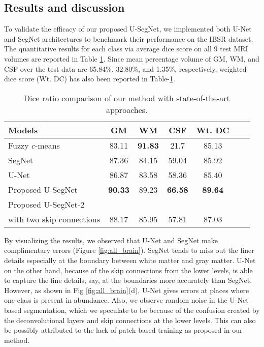 \documentclass{article}
\begin{document}
\subsection{Results and discussion}

To validate the efficacy of our proposed U-SegNet, we implemented both U-Net and SegNet architectures to benchmark their performance on the IBSR dataset. The quantitative results for each class via average dice score on all 9 test MRI volumes are reported in Table \ref{table:datasets}. Since mean percentage volume of GM, WM, and CSF over the test data are 65.84\%, 32.80\%, and 1.35\%, respectively, weighted dice score (Wt. DC) has also been reported in Table-\ref{table:datasets}.

\renewcommand{\tabcolsep}{0.08cm}
\begin{table}[!ht]
\centering
\begin{tabular}{l c c c c c c}
\toprule[0.2mm]
\textbf{Models}  & \textbf{GM}   & \textbf{WM}   &   \textbf{CSF} & \textbf{Wt. DC} \\
\midrule
Fuzzy $c$-means \cite{1} & 83.11 & \textbf{91.83} & 21.7 & 85.13 \\
\midrule

SegNet \cite{badrinarayanan2017segnet} & 87.36 & 84.15 & 59.04 & 85.92\\
\midrule

U-Net \cite{u-net} & 86.87& 83.58 & 58.36 & 85.40 \\
\midrule

Proposed U-SegNet & \textbf{90.33} & 89.23 & \textbf{66.58} & \textbf{89.64}\\
\midrule

Proposed U-SegNet-2 \\ with two skip connections & 88.17 & 85.95 & 57.81 & 87.03  \\
\bottomrule[0.2mm]
\end{tabular}
\caption{Dice ratio comparison of our method with state-of-the-art approaches. }
\label{table:datasets}
\end{table}

By visualizing the results, we observed that U-Net and SegNet make complimentary errors (Figure \ref{fig:all_brain}). SegNet tends to miss out the finer details especially at the boundary between white matter and gray matter. U-Net on the other hand, because of the skip connections from the lower levels, is able to capture the fine details, say, at the boundaries more accurately than SegNet. However, as shown in Fig \ref{fig:all_brain}(d), U-Net gives errors at places where one class is present in abundance. Also, we observe random noise in the U-Net based segmentation, which we speculate to be because of the confusion created by the deconvolutional layers and skip connections at the lower levels. This can also be possibly attributed to the lack of patch-based training as proposed in our method.
\end{document}
